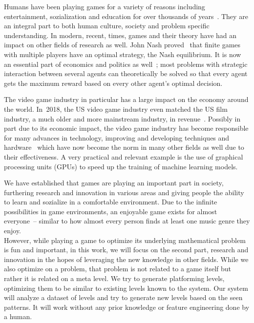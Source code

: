 Humans have been playing games for a variety of reasons including
entertainment, sozialization and education for over thousands of
years~\cite{HistoryGames2019}. They are an integral part to both human
culture, society and problem specific understanding. In modern,
recent, times, games and their theory have had an impact on other
fields of research as well. John Nash
proved~\cite{NashEquilibrium2019} that finite games with multiple
players have an optimal strategy, the Nash equilibrium. It is now an
essential part of economics and politics as
well~\cite{NashEquilibrium2019}; most problems with strategic
interaction between several agents can theoretically be solved so that
every agent gets the maximum reward based on every other agent's
optimal decision.

The video game industry in particular has a large impact on the
economy around the world. In~2018, the US video game industry even
matched the US film industry, a much older and more mainstream
industry, in revenue~\cite{VideoGameIndustry2019}. Possibly in part
due to its economic impact, the video game industry has become
responsible for many advances in technology, improving and developing
techniques and hardware~\cite{VideoGameIndustry2019} which have now
become the norm in many other fields as well due to their
effectiveness. A very practical and relevant example is the use of
graphical processing units (GPUs) to speed up the training of machine
learning models.

We have established that games are playing an important part in
society, furthering research and innovation in various areas and
giving people the ability to learn and sozialize in a comfortable
environment. Due to the infinite possibilities in game environments,
an enjoyable game exists for almost everyone~-- similar to how almost
every person finds at least one music genre they enjoy. \\
However, while playing a game to optimize its underlying mathematical
problem is fun and important, in this work, we will focus on the
second part, research and innovation in the hopes of leveraging the
new knowledge in other fields. While we also optimize on a problem,
that problem is not related to a game itself but rather it is related
on a meta level. We try to generate platforming levels, optimizing
them to be similar to existing levels known to the system. Our system
will analyze a dataset of levels and try to generate new levels based
on the seen patterns. It will work without any prior knowledge or
feature engineering done by a human.


